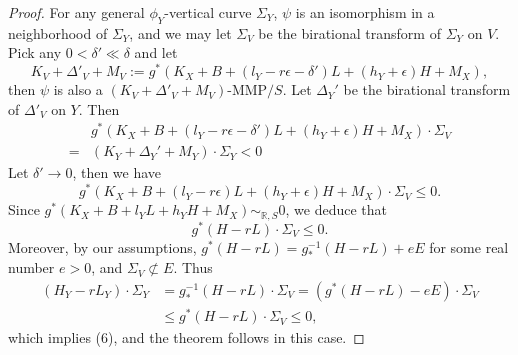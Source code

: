 \documentclass[11pt]{amsart}
\numberwithin{equation}{section}
\theoremstyle{definition}
\theoremstyle{definition}
\theoremstyle{definition}
\begin{document}
\begin{proof}
For any general $\phi_Y$-vertical curve $\Sigma_Y$, $\psi$ is an isomorphism in a neighborhood of $\Sigma_Y$, and we may let $\Sigma_V$ be the birational transform of $\Sigma_Y$ on $V$. Pick any $0<\delta'\ll\delta$ and let
$$K_V+\Delta'_V+M_V:=g^*(K_X+B+(l_Y-r\epsilon-\delta')L+(h_Y+\epsilon)H+M_X),$$
then $\psi$ is also a $(K_V+\Delta'_V+M_V)$-MMP$/S$. Let $\Delta_Y'$ be the birational transform of $\Delta'_V$ on $Y$. Then
\begin{align*}
&g^*(K_X+B+(l_Y-r\epsilon-\delta')L+(h_Y+\epsilon)H+M_X)\cdot\Sigma_V\\
=&(K_Y+\Delta_Y'+M_Y)\cdot\Sigma_Y<0
\end{align*}
Let $\delta'\rightarrow 0$, then we have
$$g^*(K_X+B+(l_Y-r\epsilon)L+(h_Y+\epsilon)H+M_X)\cdot\Sigma_V\leq 0.$$
Since $g^*(K_X+B+l_YL+h_YH+M_X)\sim_{\mathbb R,S}0$, we deduce that
$$g^*(H-rL)\cdot\Sigma_V\leq 0.$$
Moreover, by our assumptions, $g^*(H-rL)=g^{-1}_*(H-rL)+eE$ for some real number $e>0$, and $\Sigma_V\not\subset E$. Thus
\begin{align*}
    (H_Y-rL_Y)\cdot\Sigma_Y&=g^{-1}_*(H-rL)\cdot\Sigma_V=(g^*(H-rL)-eE)\cdot\Sigma_V\\
    &\leq g^*(H-rL)\cdot\Sigma_V\leq 0,
\end{align*}
which implies (6), and the theorem follows in this case.

\medskip



\end{proof}
\end{document}
